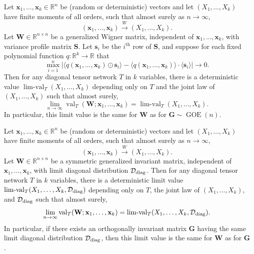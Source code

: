 \documentclass[10pt,reqno]{amsart}
\def\s{\mathbf{s}}
\def\x{\mathbf{x}}
\def\W{\mathbf{W}}
\def\S{\mathbf{S}}
\def\G{\mathbf{G}}
\def\R{\mathbb{R}}
\def\val{\operatorname{val}}
\def\limval{\operatorname{lim-val}}
\def\GOE{\operatorname{GOE}}
\def\toW{\overset{W}{\to}}
\newcommand{\tdiag}{\mathrm{diag}}
\begin{document}
\begin{lemma}\label{lemma:Wignermoments}
Let $\x_1,\ldots,\x_k \in \R^n$ be (random or deterministic) vectors and let
$(X_1,\ldots,X_k)$ have finite moments of all orders,
such that almost surely as $n \to \infty$,
\begin{equation}\label{eq:WignerMomentsWpConvergence}
(\x_1,\ldots,\x_k) \toW (X_1,\ldots,X_k).
\end{equation}
Let $\W \in \R^{n \times n}$ be a generalized Wigner matrix,
independent of $\x_1,\ldots,\x_k$, with variance profile matrix $\S$.
Let $\s_i$ be the $i^\text{th}$ row of $\S$,
and suppose for each fixed polynomial function $q:\R^k \to \R$ that
\begin{equation}\label{eq:WignerMomentsVP}
\max_{i=1}^n \Big|\langle q(\x_1,\ldots,\x_k) \odot \s_i \rangle
-\langle q(\x_1,\ldots,\x_k) \rangle \cdot \langle \s_i \rangle \Big| \to 0.
\end{equation}
Then for any diagonal tensor network $T$ in $k$ variables, there is a
deterministic value $\limval_T(X_1,\ldots,X_k)$ depending only
on $T$ and the joint law of $(X_1,\ldots,X_k)$ such that almost surely,
\[\lim_{n \to \infty} \val_T(\W;\x_1,\ldots,\x_k)
=\limval_T(X_1,\ldots,X_k).\]
In particular, this limit value is the same for $\W$ as for $\G \sim \GOE(n)$.
\end{lemma}

\begin{lemma}\label{lemma:syminvmoments}
Let $\x_1,\ldots,\x_k \in \R^n$ be (random or deterministic) vectors and let
$(X_1,\ldots,X_k)$ have finite moments of all orders,
such that almost surely as $n \to \infty$,
\begin{equation}
(\x_1,\ldots,\x_k) \toW (X_1,\ldots,X_k).
\end{equation}
Let $\W \in \R^{n \times n}$ be a symmetric generalized invariant
matrix, independent of $\x_1,\ldots,\x_k$,
with limit diagonal distribution $\cD_\tdiag$.
Then for any diagonal tensor
network $T$ in $k$ variables, there is a deterministic limit value
$\limval_T(X_1,\ldots,X_k,\cD_\tdiag)$ depending only on $T$, the joint law of
$(X_1,\ldots,X_k)$, and $\cD_\tdiag$ such that almost surely,
\[\lim_{n \to \infty} \val_T(\W;\x_1,\ldots,\x_k)
=\limval_T(X_1,\ldots,X_k,\cD_\tdiag).\]
In particular, if there exists an orthogonally invariant matrix $\G$ having 
the same limit diagonal distribution $\cD_\tdiag$, then this limit value is 
the same for $\W$ as for $\G$.
\end{lemma}
\end{document}
